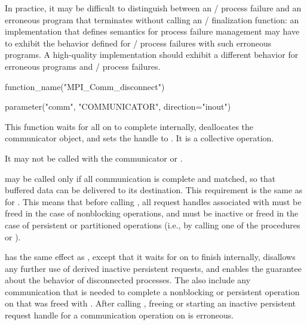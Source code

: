 \begin{implementors}
    In practice, it may be difficult to distinguish between an \MPI/ process failure
    and an erroneous program that terminates without calling
    an \MPI/ finalization function: an implementation that defines semantics for
    process failure management
    may have to exhibit the behavior defined for \MPI/ process
    failures with such erroneous programs.
    A high-quality implementation should exhibit a different behavior
    for erroneous programs and \MPI/ process failures.
\end{implementors}


\begin{mpi-binding}
    function_name("MPI_Comm_disconnect")

    parameter("comm", "COMMUNICATOR", direction="inout")
\end{mpi-binding}


This function waits for all
 on 
to complete internally, deallocates the communicator object, and sets the handle to
. It is a collective operation.

It may not be called with the communicator
 or .

 may be called only if
all communication is complete and matched, so that buffered
data can be delivered to its destination. This requirement is
the same as for .
This means that before calling , all request handles associated
with  must be freed in the case of nonblocking operations,
and must be inactive or freed in the case of persistent or partitioned operations
(i.e., by calling one of the procedures
%
%
%
%
%
%
%
%
or ).

 has the same effect as
, except that it waits for
on  to finish internally,
disallows any further use of derived inactive persistent requests,
and enables the
guarantee about the behavior of disconnected processes.
The  also
include any communication
that is needed to complete a nonblocking or persistent operation on 
that was freed with .
After calling , freeing or starting
an inactive persistent request handle for a communication operation on  is erroneous.

